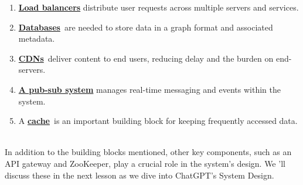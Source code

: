 \begin{enumerate}
\item
\protect{}\label{E6a8kU_iT_yE-3QySzSCD}
\href{https://www.educative.io/courses/grokking-the-system-design-interview/introduction-to-load-balancers}{\textbf{Load balancers}} distribute user requests across multiple servers and services.
\item
\protect{}\label{2vMPysixS2rdYKAUR4bDX}
\href{https://www.educative.io/courses/grokking-the-system-design-interview/introduction-to-databases}{\textbf{Databases}}~are needed to store data in a graph format and associated metadata.
\item
\protect{}\label{m__q9RBRpwLRNN2t2tXyk}
\href{https://www.educative.io/courses/grokking-the-system-design-interview/system-design-the-content-delivery-network-cdn}{\textbf{CDNs}}~deliver content to end users, reducing delay and the burden on end-servers.
\item
\protect{}\label{ZgiT0GUGNQJFPh-J1uB6K}
\href{https://www.educative.io/courses/grokking-the-system-design-interview/system-design-the-pub-sub-abstraction}{\textbf{A pub-sub system}} manages real-time messaging and events within the system.
\item
\protect{}\label{QfVhtkrrV6PmIQoVupeMk}
A \href{https://www.educative.io/courses/grokking-the-system-design-interview/system-design-the-distributed-cache}{\textbf{cache}}~is an important building block for keeping frequently accessed data.
\end{enumerate}
\\
In addition to the building blocks mentioned, other key components, such as an API gateway and ZooKeeper, play a crucial role in the system's design. We 'll discuss these in the next lesson as we dive into ChatGPT's System Design.

